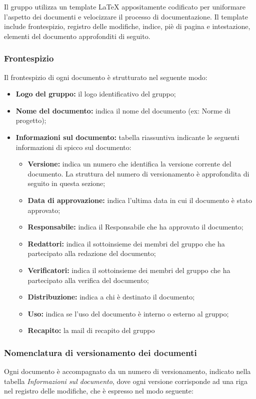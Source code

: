 \documentclass[../NormediProgetto.tex]{subfiles}
\begin{document}
Il gruppo utilizza un template \LaTeX{} appositamente codificato per uniformare l'aspetto dei documenti e velocizzare il processo di documentazione. Il template include frontespizio, registro delle modifiche, indice, piè di pagina e intestazione, elementi del documento approfonditi di seguito. 

\subsubsection{Frontespizio}

Il frontespizio di ogni documento è strutturato nel seguente modo:

\begin{itemize}
	\item \textbf{Logo del gruppo:} il logo identificativo del gruppo;
	\item \textbf{Nome del documento:} indica il nome del documento (ex: Norme di progetto);
	\item \textbf{Informazioni sul documento:} tabella riassuntiva indicante le seguenti informazioni di spicco sul documento:
	\begin{itemize}
		\item \textbf{Versione:} indica un numero che identifica la versione corrente del documento. La struttura del numero di versionamento è approfondita di seguito in questa sezione;
		\item \textbf{Data di approvazione:} indica l'ultima data in cui il documento è stato approvato;
		\item \textbf{Responsabile:} indica il Responsabile che ha approvato il documento;
		\item \textbf{Redattori:} indica il sottoinsieme dei membri del gruppo che ha partecipato alla redazione del documento;
		\item \textbf{Verificatori:} indica il sottoinsieme dei membri del gruppo che ha partecipato alla verifica del documento;
		\item \textbf{Distribuzione:} indica a chi è destinato il documento;
		\item \textbf{Uso:} indica se l'uso del documento è interno o esterno al gruppo;          
		\item \textbf{Recapito:} la mail di recapito del gruppo
	\end{itemize}
	
\end{itemize}

\subsubsection{Nomenclatura di versionamento dei documenti}
Ogni documento è accompagnato da un numero di versionamento, indicato nella tabella \textit{Informazioni sul documento}, dove ogni versione corrisponde ad una riga nel registro delle modifiche, che è espresso nel modo seguente:
\end{document}
